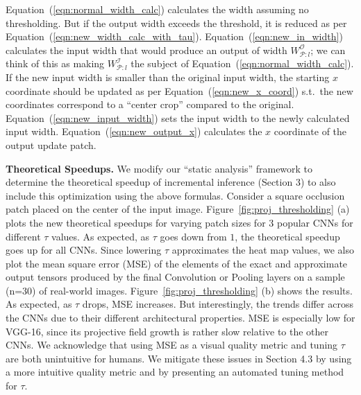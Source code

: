 Equation~(\ref{eqn:normal_width_calc}) calculates the width assuming no thresholding. But if the output width exceeds the threshold, it is reduced as per Equation~(\ref{eqn:new_width_calc_with_tau}). Equation~(\ref{eqn:new_in_width}) calculates the input width that would produce an output of width $W^\mathcal{O}_{\mathcal{P}:l}$; we can think of this as making $W^{\mathcal{I}}_{\mathcal{P}:l}$ the subject of Equation~(\ref{eqn:normal_width_calc}). If the new input width is smaller than the original input width, the starting $x$ coordinate should be updated as per Equation~(\ref{eqn:new_x_coord}) s.t.~the new coordinates correspond to a ``center crop'' compared to the original. Equation~(\ref{eqn:new_input_width}) sets the input width to the newly calculated input width. Equation~(\ref{eqn:new_output_x}) calculates the $x$ coordinate of the output update patch.

\vspace{2mm}
\noindent \textbf{Theoretical Speedups.}
We modify our ``static analysis'' framework to determine the theoretical speedup of incremental inference (Section 3) to also include this optimization using the above formulas. Consider a square occlusion patch placed on the center of the input image. Figure~\ref{fig:proj_thresholding} (a) plots the new theoretical speedups for varying patch sizes for 3 popular CNNs for different $\tau$ values.
As expected, as $\tau$ goes down from $1$, the theoretical speedup goes up for all CNNs. Since lowering $\tau$ approximates the heat map values, we also plot the mean square error (MSE) of the elements of the exact and approximate output tensors produced by the final Convolution or Pooling layers on a sample (n=30) of real-world images. Figure~\ref{fig:proj_thresholding} (b) shows the results. As expected, as $\tau$ drops, MSE increases. But interestingly, the trends differ across the CNNs due to their different architectural properties. MSE is especially low for VGG-16, since its projective field growth is rather slow relative to the other CNNs. We acknowledge that using MSE as a visual quality metric and tuning $\tau$ are both unintuitive for humans. We mitigate these issues in Section 4.3 by using a more intuitive quality metric and by presenting an automated tuning method for $\tau$.


